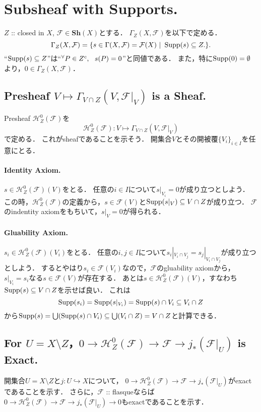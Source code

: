 \documentclass[a4paper]{jsarticle}
\newcommand{\shF}{\mathcal{F}}
\newcommand{\Sh}{\mathbf{Sh}}
\begin{document}
\section{Subsheaf with Supports.} %
    $Z$ :: closed in $X$, $\shF \in \Sh(X)$とする．
    $\Gamma_Z(X, \shF)$を以下で定める．
    \[ \Gamma_Z(X, \shF)=\{ s \in \Gamma(X, \shF)=\shF(X) ~|~ \Supp(s) \subseteq Z. \}. \]
    ``$\operatorname{Supp}(s) \subseteq Z$''は``${}^{\forall} P \in Z^c,~~ s(P)=0$''と同値である．
    また，特に$\operatorname{Supp}(0)=\emptyset$より，$0 \in \Gamma_Z(X, \shF)$．

    \subsection{Presheaf $V \mapsto \Gamma_{V \cap Z}(V, \shF|_V)$ is a Sheaf.}
    Presheaf $\mathscr{H}_Z^0(\shF)$を
    \[ \mathscr{H}_Z^0(\shF): V \mapsto \Gamma_{V \cap Z}(V, \shF|_V) \]
    で定める．
    これがsheafであることを示そう．
    開集合$V$とその開被覆$\{V_i\}_{i \in I}$を任意にとる．

    \paragraph{Identity Axiom.}
    $s \in \mathscr{H}_Z^0(\shF)(V)$をとる．
    任意の$i \in I$について$s|_{V_i}=0$が成り立つとしよう．
    この時，$\mathscr{H}_Z^0(\shF)$の定義から，$s \in \shF(V)$と$\operatorname{Supp} (s|_V) \subseteq V \cap Z$が成り立つ．
    $\shF$のindentity axiomをもちいて，$s|_V=0$が得られる．

    \paragraph{Gluability Axiom.}
    $s_i \in \mathscr{H}_Z^0(\shF)(V_i)$をとる．
    任意の$i,j \in I$について$s_i|_{V_i \cap V_j}=s_j|_{V_i \cap V_j}$が成り立つとしよう．
    するとやはり$s_i \in \shF(V_i)$なので，$\shF$のgluability axiomから，
    $s|_{V_i}=s_i$なる$s \in \shF(V)$が存在する．
    あとは$s \in \mathscr{H}_Z^0(\shF)(V)$，すなわち$\operatorname{Supp}(s) \subseteq V \cap Z$を示せば良い．
    これは
    \[ \operatorname{Supp}(s_i)=\operatorname{Supp}(s|_{V_i})=\operatorname{Supp}(s) \cap V_i \subseteq V_i \cap Z\]
    から$\operatorname{Supp}(s)=\bigcup (\operatorname{Supp}(s) \cap V_i) \subseteq \bigcup (V_i \cap Z)=V \cap Z$と計算できる．

    \subsection{For $U=X \setminus Z$，$0 \to \mathscr{H}_Z^0(\shF) \to \shF \to j_*(\shF|_U)$ is Exact.}
    開集合$U=X \setminus Z$と$j: U \hookrightarrow X$について，
    $0 \to \mathscr{H}_Z^0(\shF) \to \shF \to j_*(\shF|_U)$がexactであることを示す．
    さらに，$\shF$ :: flasqueならば$0 \to \mathscr{H}_Z^0(\shF) \to \shF \to j_*(\shF|_U) \to 0$もexactであることを示す．
\end{document}
